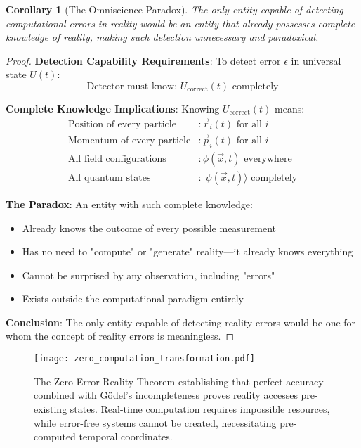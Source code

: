 \documentclass[12pt,a4paper]{article}
\newtheorem{corollary}[theorem]{Corollary}
\begin{document}
\begin{corollary}[The Omniscience Paradox]
The only entity capable of detecting computational errors in reality would be an entity that already possesses complete knowledge of reality, making such detection unnecessary and paradoxical.
\end{corollary}

\begin{proof}
\textbf{Detection Capability Requirements}: To detect error $\epsilon$ in universal state $U(t)$:
$$\text{Detector must know: } U_{\text{correct}}(t) \text{ completely}$$

\textbf{Complete Knowledge Implications}: Knowing $U_{\text{correct}}(t)$ means:
\begin{align}
\text{Position of every particle} &: \vec{r}_i(t) \text{ for all } i \\
\text{Momentum of every particle} &: \vec{p}_i(t) \text{ for all } i \\
\text{All field configurations} &: \phi(\vec{x},t) \text{ everywhere} \\
\text{All quantum states} &: |\psi(\vec{x},t)\rangle \text{ completely}
\end{align}

\textbf{The Paradox}: An entity with such complete knowledge:
\begin{itemize}
    \item Already knows the outcome of every possible measurement
    \item Has no need to "compute" or "generate" reality—it already knows everything
    \item Cannot be surprised by any observation, including "errors"
    \item Exists outside the computational paradigm entirely
\end{itemize}

\textbf{Conclusion}: The only entity capable of detecting reality errors would be one for whom the concept of reality errors is meaningless.
\end{proof}


\begin{figure}[h]
\centering
\texttt{[image: zero\_computation\_transformation.pdf]}
\caption{The Zero-Error Reality Theorem establishing that perfect accuracy combined with Gödel's incompleteness proves reality accesses pre-existing states. Real-time computation requires impossible resources, while error-free systems cannot be created, necessitating pre-computed temporal coordinates.}
\label{fig:zero_computation_transformation}
\end{figure}
\end{document}
